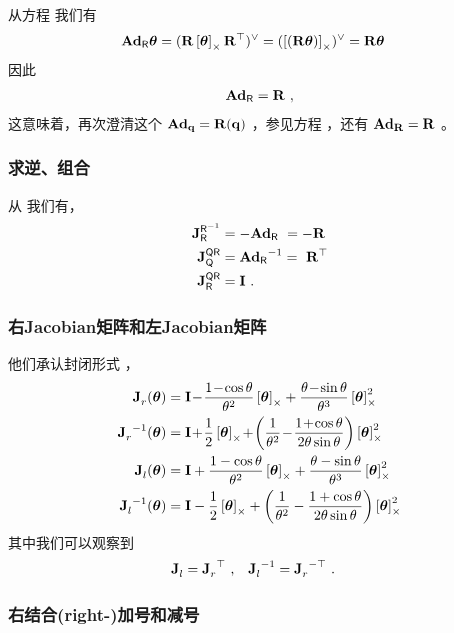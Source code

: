从方程  我们有
%
\begin{align*}
\Ad{\sR} \bth
&= (\bfR\hatx{\bth}\bfR\tr)^\vee 
= (\hatx{(\bfR\bth)})^\vee 
= \bfR\bth
\end{align*}
%
因此
%
\begin{align}
\Ad{\sR} = \bfR~,
\end{align}
%
这意味着，再次澄清这个 $\Ad[S^3]{\bfq}=\bfR(\bfq)$ ，参见方程  ，还有 $\Ad[\SO(3)]{\bfR}=\bfR$ 。

\subsubsection{求逆、组合}
\label{sec:SO3_inv_comp}

从  我们有，
%
\begin{align}
\mjac{\sR\inv}{\sR} &= -\Ad{\sR} ~= -\bfR \\
\mjac{\sQ\sR}{\sQ} &= \Ad{\sR}\inv = ~\bfR\tr \\
\mjac{\sQ\sR}{\sR} &= \bfI ~.
\end{align}


\subsubsection{右Jacobian矩阵和左Jacobian矩阵}

他们承认封闭形式 \cite[pag.~40]{CHIRIKJIAN-11}， 
%
\begin{align}
\mjac{}{r}(\bth) &= \bfI \!-\! \frac{1\!-\!\cos\theta}{\theta^2}\hatx{\bth} + \frac{\theta\!-\!\sin\theta}{\theta^3}\hatx{\bth}^2\\
\mjac{}{r}\inv(\bth) &= \bfI \!+\! \frac12\hatx{\bth} \!+\! \left(\frac{1}{\theta^2} \!-\! \frac{1\!+\!\cos\theta}{2\theta\sin\theta}\right)\hatx{\bth}^2 \\
\mjac{}{l}(\bth) &= \bfI + \frac{1-\cos\theta}{\theta^2}\hatx{\bth} + \frac{\theta-\sin\theta}{\theta^3}\hatx{\bth}^2  \label{equ:SO3_Jl} \\
\mjac{}{l}\inv(\bth) &= \bfI - \frac12\hatx{\bth} + \left(\frac1{\theta^2} - \frac{1+\cos\theta}{2\theta\sin\theta}\right)\hatx{\bth}^2 \label{equ:SO3_Jl_inv}
\end{align}
%
其中我们可以观察到
%
\begin{align}
\mjac{}{l} &= \mjac{}{r}\tr 
~,
&
\mjac{}{l}\inv &= \mjac{}{r}^{-\top}
~.
\end{align}

\subsubsection{右结合(right-)加号和减号}

